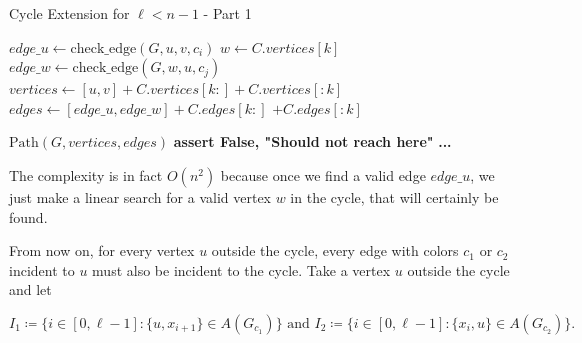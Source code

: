 \begin{algorithm}[H]
    \caption{Cycle Extension for \( \ell < n - 1 \) - Part 1}
    \begin{algorithmic}
            \For{$[c_i, c_j] \in [[c_1, c_2], [c_2, c_1]]$} 
                            \State $edge\_u \gets \text{check\_edge}(G, u, v, c_i)$
                                    \State $w \gets C.vertices[k]$
                                    \State $edge\_w \gets \text{check\_edge}(G, w, u, c_j)$
                                        \State $vertices \gets [u, v] + C.vertices[k:] + C.vertices[:k]$
                                        \State $edges \gets [edge\_u, edge\_w] + C.edges[k:]$
                                        \State \hspace{3em} $+ C.edges[:k]$
                                        
                                        \State \Return $\text{Path}(G, vertices, edges)$
                                    \EndIf
                                \EndFor
                                \State \textbf{assert False, "Should not reach here"}
                            \EndIf
                        \EndIf
                    \EndFor
                \EndFor
            \EndFor
            \State \textbf{...}
        \EndFunction
    \end{algorithmic}
\end{algorithm}

The complexity is in fact $O(n^2)$ because once we find a valid edge $edge\_u$, we 
just make a linear search for a valid vertex $w$ in the cycle, that will 
certainly be found.

From now on, for every vertex $u$ outside the cycle, every edge with colors $c_1$ or $c_2$ incident to 
$u$ must also be incident to the cycle. Take a vertex $u$ outside the cycle and let

$$
I_1 \coloneqq \{i \in [0, \ell - 1]: \{u, x_{i + 1}\} \in A(G_{c_1})\} \text{ and } I_2 \coloneqq \{i \in [0, \ell - 1]: \{x_i, u\} \in A(G_{c_2})\}.
$$

